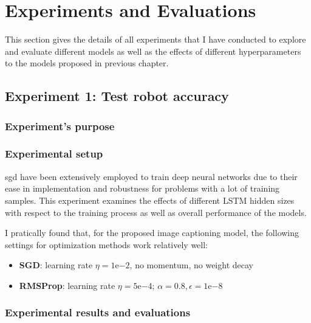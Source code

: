 \section{Experiments and Evaluations}
\label{sec:chap4_experiment}

This section gives the details of all experiments that I have conducted to explore and evaluate different models as well as the effects of different hyperparameters to the models proposed in previous chapter. 


\subsection{Experiment 1: Test robot accuracy}
\subsubsection{Experiment's purpose}

\subsubsection{Experimental setup}
\gls{sgd} have been extensively employed to train deep neural networks due to their ease in implementation and robustness for problems with a lot of training samples. This experiment examines the effects of different LSTM hidden sizes with respect to the training process as well as overall performance of the models.

I pratically found that, for the proposed image captioning model, the following settings for optimization methods work relatively well:
	\begin{itemize}
		\item \textbf{SGD}: learning rate $\eta = 1\mathrm{e}{-2}$, no momentum, no weight decay
		\item \textbf{RMSProp}: learning rate $\eta = 5\mathrm{e}{-4}$; $\alpha = 0.8, \epsilon = 1\mathrm{e}{-8}$
	\end{itemize}

\subsubsection{Experimental results and evaluations}

